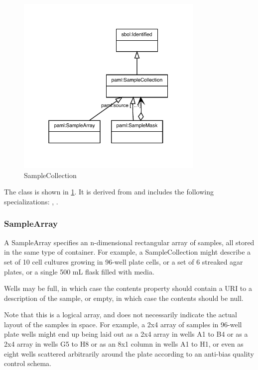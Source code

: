 \begin{figure}[h!]%
\centering%
\includegraphics[width=0.8\textwidth]{paml_classes/SampleCollection_abstraction_hierarchy.pdf}%
\caption{SampleCollection}%
\label{fig:SampleCollection}%
\end{figure}

%
The  class is shown in \ref{fig:SampleCollection}. It is derived from  and includes the following specializations: , . %
%
\subsubsection{SampleArray}%
\label{sec:paml:SampleArray}%
A SampleArray specifies an n-dimensional rectangular array of samples, all stored in the same
        type of container. For example, a SampleCollection might describe a set of 10 cell cultures growing in
        96-well plate cells, or a set of 6 streaked agar plates, or a single 500 mL flask filled with media.

        Wells may be full, in which case the contents property should contain a URI to a description of the sample,
        or empty, in which case the contents should be null.

        Note that this is a logical array, and does not necessarily indicate the actual layout of the samples in space.
        For example, a 2x4 array of samples in 96-well plate wells might end up being laid out as a 2x4 array in wells
        A1 to B4 or as a 2x4 array in wells G5 to H8 or as an 8x1 column in wells A1 to H1, or even as eight wells
        scattered arbitrarily around the plate according to an anti-bias quality control schema.

